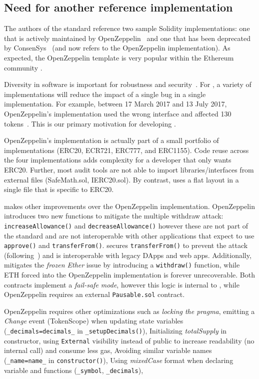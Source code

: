 \subsection{Need for another reference implementation}

The authors of the \erc standard reference two sample Solidity implementations: one that is actively maintained by OpenZeppelin~\cite{OpenZepplin} and one that has been deprecated by ConsenSys~\cite{ConsensysToken} (and now refers to the OpenZeppelin implementation). As expected, the OpenZeppelin template is very popular within the Ethereum community \cite{OPZ1,OPZ2,OPZ3}.

Diversity in software is important for robustness and security~\cite{FSA97,FHS97}. For \erc, a variety of implementations will reduce the impact of a single bug in a single implementation. For example, between 17 March 2017 and 13 July 2017, OpenZeppelin's implementation used the wrong interface and affected 130 tokens~\cite{ErcBug}. This is our primary motivation for developing \sys.

OpenZeppelin's implementation is actually part of a small portfolio of implementations (ERC20, ECR721, ERC777, and ERC1155). Code reuse across the four implementations adds complexity for a developer that only wants ERC20. Further, most audit tools are not able to import libraries/interfaces from external files (\eg SafeMath.sol, IERC20.sol). By contrast, \sys uses a flat layout in a single file that is specific to ERC20.

\sys makes other improvements over the OpenZeppelin implementation. OpenZeppelin introduces two new functions to mitigate the multiple withdraw attack: \texttt{increaseAllowance()} and \texttt{decreaseAllowance()} however these are not part of the \sys standard and are not  interoperable with other applications that expect to use \texttt{approve()} and \texttt{transferFrom()}. \sys secures \texttt{transferFrom()} to prevent the attack (following~\cite{ERC20MWA}) and is interoperable with legacy DApps and web apps. Additionally, \sys mitigates the \textit{frozen Ether} issue by introducing a \texttt{withdraw()} function, while ETH forced into the OpenZeppelin implementation is forever unrecoverable. Both contracts implement a \textit{fail-safe mode}, however this logic is internal to \sys, while OpenZeppelin requires an external \texttt{Pausable.sol} contract.

OpenZeppelin requires other optimizations such as \textit{locking the pragma}, emitting a \textit{Change} event (\cf TokenScope\cite{TokenScope}) when updating state variables (\eg \texttt{\_decimals=decimals\_} in \texttt{\_setupDecimals()}),  Initializing \textit{totalSupply} in constructor, using \texttt{External} visibility instead of public to increase readability (\ie no internal call) and consume less gas, Avoiding similar variable names (\eg \texttt{\_name=name\_} in \texttt{constructor()}), Using \textit{mixedCase} format when declaring variable and functions (\eg \texttt{\_symbol}, \texttt{\_decimals}), \etc





